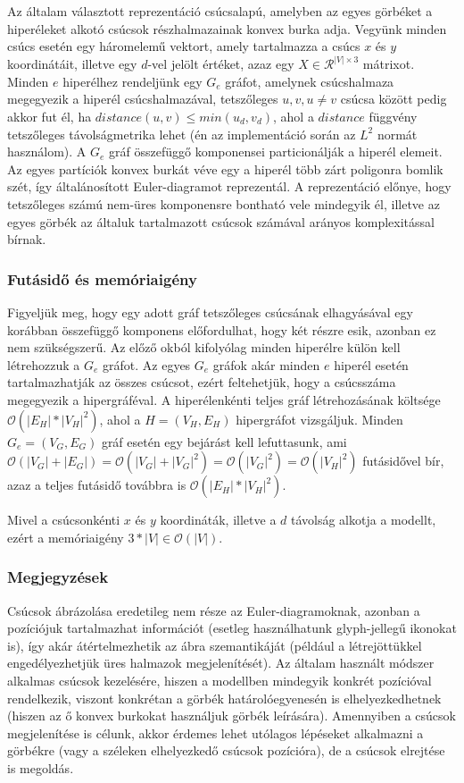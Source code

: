Az általam választott reprezentáció csúcsalapú, amelyben az egyes görbéket a hiperéleket alkotó csúcsok részhalmazainak konvex burka adja. Vegyünk minden csúcs esetén egy háromelemű vektort, amely tartalmazza a csúcs $x$ és $y$ koordinátáit, illetve egy $d$-vel jelölt értéket, azaz egy $X \in \mathcal{R}^{|V| \times 3}$ mátrixot. Minden $e$ hiperélhez rendeljünk egy $G_e$ gráfot, amelynek csúcshalmaza megegyezik a hiperél csúcshalmazával, tetszőleges $u, v, u \neq v$ csúcsa között pedig akkor fut él, ha $distance(u, v) \leq min(u_d, v_d)$, ahol a $distance$ függvény tetszőleges távolságmetrika lehet (én az implementáció során az $L^2$ normát használom). A $G_e$ gráf összefüggő komponensei particionálják a hiperél elemeit. Az egyes partíciók konvex burkát véve egy a hiperél több zárt poligonra bomlik szét, így általánosított Euler-diagramot reprezentál. A reprezentáció előnye, hogy tetszőleges számú nem-üres komponensre bontható vele mindegyik él, illetve az egyes görbék az általuk tartalmazott csúcsok számával arányos komplexitással bírnak.

\subsubsection{Futásidő és memóriaigény}

Figyeljük meg, hogy egy adott gráf tetszőleges csúcsának elhagyásával egy korábban összefüggő komponens előfordulhat, hogy két részre esik, azonban ez nem szükségszerű. Az előző okból kifolyólag minden hiperélre külön kell létrehozzuk a $G_e$ gráfot. Az egyes $G_e$ gráfok akár minden $e$ hiperél esetén tartalmazhatják az összes csúcsot, ezért feltehetjük, hogy a csúcsszáma megegyezik a hipergráféval. A hiperélenkénti teljes gráf létrehozásának költsége $\mathcal{O}(|E_H|*|V_H|^2)$, ahol a $H=(V_H,E_H)$ hipergráfot vizsgáljuk. Minden $G_e=(V_G,E_G)$ gráf esetén egy bejárást kell lefuttasunk, ami $\mathcal{O}(|V_G|+|E_G|) = \mathcal{O}(|V_G| + |V_G|^2) = \mathcal{O}(|V_G|^2) = \mathcal{O}(|V_H|^2)$ futásidővel bír, azaz a teljes futásidő továbbra is $\mathcal{O}(|E_H|*|V_H|^2)$.


Mivel a csúcsonkénti $x$ és $y$ koordináták, illetve a $d$ távolság alkotja a modellt, ezért a memóriaigény $3*|V| \in \mathcal{O}(|V|)$.

\subsubsection{Megjegyzések}

Csúcsok ábrázolása eredetileg nem része az Euler-diagramoknak, azonban a pozíciójuk tartalmazhat információt (esetleg használhatunk  glyph-jellegű ikonokat is), így akár átértelmezhetik az ábra szemantikáját (például a létrejöttükkel engedélyezhetjük üres halmazok megjelenítését). Az általam használt módszer alkalmas csúcsok kezelésére, hiszen a modellben mindegyik konkrét pozícióval rendelkezik, viszont konkrétan a görbék határolóegyenesén is elhelyezkedhetnek (hiszen az ő konvex burkokat használjuk görbék leírására). Amennyiben a csúcsok megjelenítése is célunk, akkor érdemes lehet utólagos lépéseket alkalmazni a görbékre (vagy a széleken elhelyezkedő csúcsok pozícióra), de a csúcsok elrejtése is megoldás.


